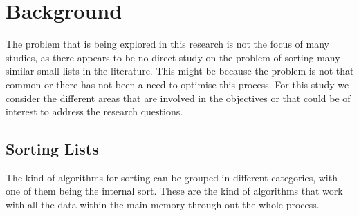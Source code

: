 \documentclass[a4paper,12pt]{article}
\begin{document}
\section{Background}

The problem that is being explored in this research is not the focus of many studies, as there appears to be no direct study on the problem of sorting many similar small lists in the literature. This might be because the problem is not that common or there has not been a need to optimise this process. For this study we consider the different areas that are involved in the objectives or that could be of interest to address the research questions.

\subsection {Sorting Lists}
The kind of algorithms for sorting can be grouped in different categories, with one of them being the internal sort. These are the kind of algorithms that work with all the data within the main memory through out the whole process.
\end{document}
